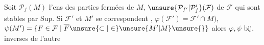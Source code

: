  Soit $\mathcal P_f(M)$ l'ens des parties fermées de $M$, $\unsure{\mathcal P_{f'}|\mathcal P'_f}(\mathcal F)$ de $\mathcal F$ qui sont stables par Sup. Si $\mathcal F'$ et $M'$ se correspondent , 
$\varphi(\mathcal F')=\mathcal F'\cap M)$, $\psi(M')=\{F\in\mathcal F\mid\overline F\unsure{\subset|\in} \unsure{M'|M}\unsure{\}}$ alors $\varphi,\psi$ bij. inverses  de l'autre
